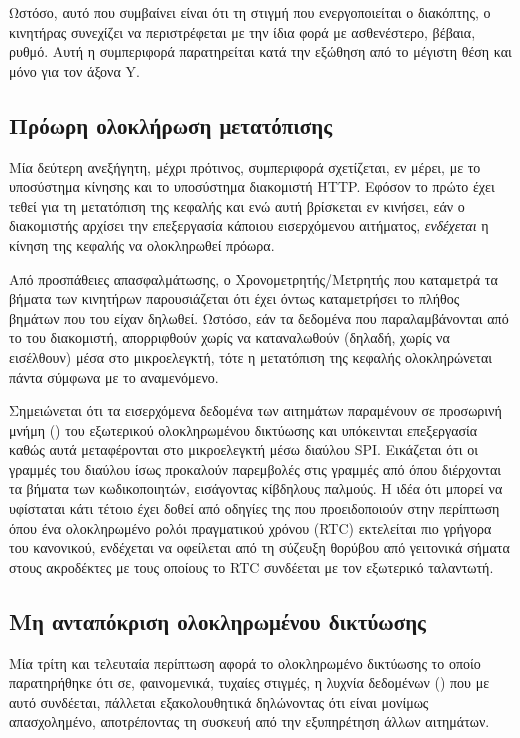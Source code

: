 Ωστόσο, αυτό που συμβαίνει είναι ότι τη στιγμή που ενεργοποιείται ο διακόπτης,
ο κινητήρας συνεχίζει να περιστρέφεται με την ίδια φορά με ασθενέστερο, βέβαια,
ρυθμό. Αυτή η συμπεριφορά παρατηρείται κατά την εξώθηση από το μέγιστη θέση και
μόνο για τον άξονα Y.


\subsection*{Πρόωρη ολοκλήρωση μετατόπισης}

Μία δεύτερη ανεξήγητη, μέχρι πρότινος, συμπεριφορά σχετίζεται, εν μέρει, με το
υποσύστημα κίνησης και το υποσύστημα διακομιστή HTTP. Εφόσον το πρώτο έχει
τεθεί για τη μετατόπιση της κεφαλής και ενώ αυτή βρίσκεται εν κινήσει, εάν ο
διακομιστής αρχίσει την επεξεργασία κάποιου εισερχόμενου αιτήματος,
\emph{ενδέχεται} η κίνηση της κεφαλής να ολοκληρωθεί πρόωρα.

Από προσπάθειες απασφαλμάτωσης, ο Χρονομετρητής\slash{}Μετρητής που καταμετρά
τα βήματα των κινητήρων παρουσιάζεται ότι έχει όντως καταμετρήσει το πλήθος
βημάτων που του είχαν δηλωθεί. Ωστόσο, εάν τα δεδομένα που παραλαμβάνονται από
το  του διακομιστή, απορριφθούν χωρίς να καταναλωθούν (δηλαδή, χωρίς
να εισέλθουν) μέσα στο μικροελεγκτή, τότε η μετατόπιση της κεφαλής ολοκληρώνεται
πάντα σύμφωνα με το αναμενόμενο.

Σημειώνεται ότι τα εισερχόμενα δεδομένα των αιτημάτων παραμένουν σε προσωρινή
μνήμη () του εξωτερικού ολοκληρωμένου δικτύωσης και υπόκεινται
επεξεργασία καθώς αυτά μεταφέρονται στο μικροελεγκτή μέσω διαύλου SPI. Εικάζεται
ότι οι γραμμές του διαύλου ίσως προκαλούν παρεμβολές στις γραμμές από όπου
διέρχονται τα βήματα των κωδικοποιητών, εισάγοντας κίβδηλους παλμούς. Η ιδέα ότι
μπορεί να υφίσταται κάτι τέτοιο έχει δοθεί από οδηγίες της
\textcite[7]{maxim:xtal} που προειδοποιούν στην περίπτωση όπου ένα
ολοκληρωμένο ρολόι πραγματικού χρόνου (RTC) εκτελείται πιο γρήγορα του
κανονικού, ενδέχεται να οφείλεται από τη σύζευξη θορύβου από γειτονικά σήματα
στους ακροδέκτες με τους οποίους το RTC συνδέεται με τον εξωτερικό ταλαντωτή.


\subsection*{Μη ανταπόκριση ολοκληρωμένου δικτύωσης}

Μία τρίτη και τελευταία περίπτωση αφορά το ολοκληρωμένο δικτύωσης το οποίο
παρατηρήθηκε ότι σε, φαινομενικά, τυχαίες στιγμές, η λυχνία δεδομένων
() που με αυτό συνδέεται, πάλλεται εξακολουθητικά δηλώνοντας ότι
είναι μονίμως απασχολημένο, αποτρέποντας τη συσκευή από την εξυπηρέτηση άλλων
αιτημάτων.


